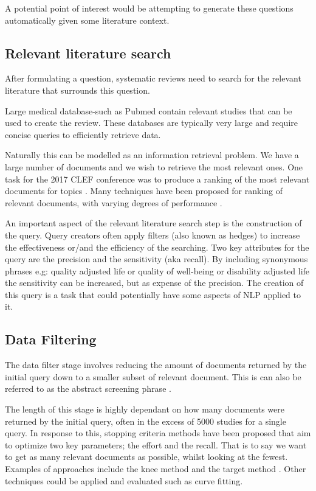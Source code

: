 A potential point of interest would be attempting to generate these questions automatically given some literature context.

\subsection{Relevant literature search}

After formulating a question, systematic reviews need to search for the relevant literature that surrounds this question.

Large medical database-such as Pubmed \cite{pubmed} contain relevant studies that can be used to create the review. These databases are typically very large and require concise queries to efficiently retrieve data.

Naturally this can be modelled as an information retrieval problem. We have a large number of documents and we wish to retrieve the most relevant ones. One task for the 2017 CLEF conference was to produce a ranking of the most relevant documents for topics \cite{Kanoulas12017}. Many techniques have been proposed for ranking of relevant documents, with varying degrees of performance \cite{Alharbi2017} \cite{Gordon2017} \cite{Eunkyung2017}.

An important aspect of the relevant literature search step is the construction of the query. Query creators often apply filters (also known as hedges) to increase the effectiveness or/and the efficiency of the searching. Two key attributes for the query are the precision and the sensitivity (aka recall). By including synonymous phrases e.g: quality adjusted life or quality of well-being or disability adjusted life the sensitivity can be increased, but as expense of the precision. The creation of this query is a task that could potentially have some aspects of NLP applied to it.



\subsection{Data Filtering}

The data filter stage involves reducing the amount of documents returned by the initial query down to a smaller subset of relevant document. This is can also be referred to as the abstract screening phrase \cite{Kanoulas12017}.

The length of this stage is highly dependant on how many documents were returned by the initial query, often in the excess of 5000 studies for a single query. In response to this, stopping criteria methods have been proposed that aim to optimize two key parameters; the effort and the recall. That is to say we want to get as many relevant documents as possible, whilst looking at the fewest. Examples of approaches include the knee method \cite{Satopa11} and the target method \cite{Cormack2016}. Other techniques could be applied and evaluated such as curve fitting.

